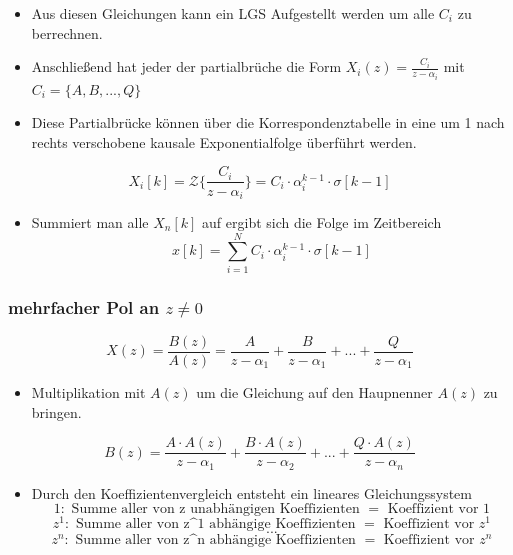 \documentclass[11pt]{article}
\providecommand{\tightlist}{%
      \setlength{\itemsep}{0pt}\setlength{\parskip}{0pt}}
\begin{document}
    \begin{itemize}
\tightlist
\item
  Aus diesen Gleichungen kann ein LGS Aufgestellt werden um alle \(C_i\)
  zu berrechnen.
\end{itemize}

    \begin{itemize}
\tightlist
\item
  Anschließend hat jeder der partialbrüche die Form
  \(X_i(z) = \frac{C_i}{z-\alpha_i}\) mit \(C_i = \{A, B, ..., Q\}\)
\end{itemize}

    \begin{itemize}
\tightlist
\item
  Diese Partialbrücke können über die Korrespondenztabelle in eine um 1
  nach rechts verschobene kausale Exponentialfolge überführt werden.
\end{itemize}

\[X_i[k] = \mathcal{Z}\big\{\frac{C_i}{z-\alpha_i}\big\} = C_i \cdot \alpha_i^{k-1} \cdot \sigma[k-1]\]

    \begin{itemize}
\tightlist
\item
  Summiert man alle \(X_n[k]\) auf ergibt sich die Folge im Zeitbereich
  \[x[k] = \sum_{i=1}^N C_i \cdot \alpha_i^{k-1} \cdot \sigma[k-1]\]
\end{itemize}

    \subsubsection{\texorpdfstring{mehrfacher Pol an
\(z \neq 0\)}{mehrfacher Pol an z \textbackslash{}neq 0}}\label{mehrfacher-pol-an-z-neq-0}

\[ X(z) = \frac{B(z)}{A(z)} = \frac{A}{z-\alpha_1} + \frac{B}{z-\alpha_1} + ... + \frac{Q}{z-\alpha_1}\]

    \begin{itemize}
\tightlist
\item
  Multiplikation mit \(A(z)\) um die Gleichung auf den Haupnenner
  \(A(z)\) zu bringen.
\end{itemize}

\[ B(z) = \frac{A\cdot A(z)}{z-\alpha_1} + \frac{B\cdot A(z)}{z-\alpha_2} + ... + \frac{Q\cdot A(z)}{z-\alpha_n}\]

    \begin{itemize}
\tightlist
\item
  Durch den Koeffizientenvergleich entsteht ein lineares
  Gleichungssystem \[
  1   : \textrm{ Summe aller von z unabhängigen Koeffizienten } = \textrm{ Koeffizient vor 1}
  \] \[
  z^1 : \textrm{ Summe aller von z^1 abhängige Koeffizienten }  = \textrm{ Koeffizient vor } z^1
  \] \[
  ...
  \] \[
  z^n : \textrm{ Summe aller von z^n abhängige Koeffizienten }  = \textrm{ Koeffizient vor } z^n
  \]
\end{itemize}
\end{document}
